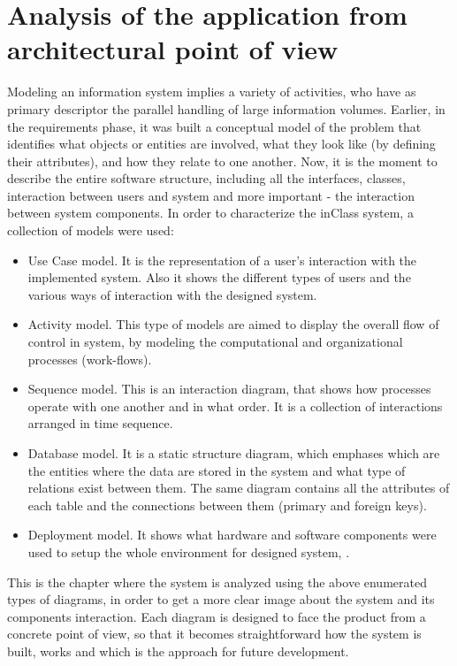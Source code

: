 \section{Analysis of the application from architectural point of view}
Modeling an information system implies a variety of activities, who have as primary descriptor the parallel handling of large information volumes. Earlier, in the requirements phase, it was built a conceptual model of the problem that identifies
what objects or entities are involved, what they look like (by defining their attributes), and how they relate
to one another. Now, it is the moment to describe the entire software structure, including all the interfaces, classes, interaction between users and system and more important - the interaction between system components. In order to characterize the inClass system, a collection of models were used:
\begin{itemize}
\item Use Case model. It is the representation of a user's interaction with the implemented system. Also it shows the different types of users and the various ways of interaction with the designed system.
\item Activity model. This type of models are aimed to display the overall flow of control in system, by modeling the computational and organizational processes (work-flows).
\item Sequence model. This is an interaction diagram, that shows how processes operate with one another and in what order. It is a collection of interactions arranged in time sequence.
\item Database model. It is a static structure diagram, which emphases which are the entities where the data are stored in the system and what type of relations exist between them. The same diagram contains all the attributes of each table and the connections between them (primary and foreign keys).
\item Deployment model. It shows what hardware and software components were used to setup the whole environment for designed system, \cite{diagrams}.
\end{itemize}
This is the chapter where the system is analyzed using the above enumerated types of diagrams, in order to get a more clear image about the system and its components interaction. Each diagram is designed to face the product from a concrete point of view, so that  it becomes straightforward how the system is built, works and which is the approach for future development.


